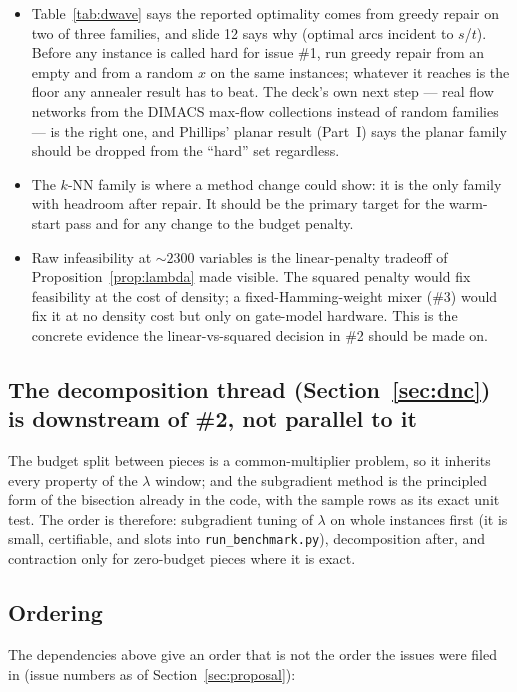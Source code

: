 \documentclass[11pt]{article}
\newcommand{\code}[1]{\texttt{#1}}
\begin{document}
\begin{itemize}[leftmargin=1.5em]
\item Table~\ref{tab:dwave} says the reported optimality comes from greedy repair on two of three families, and slide 12 says why (optimal arcs incident to $s$/$t$). Before any instance is called hard for issue \#1, run greedy repair from an empty and from a random $x$ on the same instances; whatever it reaches is the floor any annealer result has to beat. The deck's own next step --- real flow networks from the DIMACS max-flow collections instead of random families --- is the right one, and Phillips' planar result (Part~I) says the planar family should be dropped from the ``hard'' set regardless.
\item The $k$-NN family is where a method change could show: it is the only family with headroom after repair. It should be the primary target for the warm-start pass and for any change to the budget penalty.
\item Raw infeasibility at $\sim 2300$ variables is the linear-penalty tradeoff of Proposition~\ref{prop:lambda} made visible. The squared penalty would fix feasibility at the cost of density; a fixed-Hamming-weight mixer (\#3) would fix it at no density cost but only on gate-model hardware. This is the concrete evidence the linear-vs-squared decision in \#2 should be made on.
\end{itemize}

\subsection*{The decomposition thread (Section~\ref{sec:dnc}) is downstream of \#2, not parallel to it}

The budget split between pieces is a common-multiplier problem, so it inherits every property of the $\lambda$ window; and the subgradient method is the principled form of the bisection already in the code, with the sample rows as its exact unit test. The order is therefore: subgradient tuning of $\lambda$ on whole instances first (it is small, certifiable, and slots into \code{run\_benchmark.py}), decomposition after, and contraction only for zero-budget pieces where it is exact.

\subsection*{Ordering}

The dependencies above give an order that is not the order the issues were filed in (issue numbers as of Section~\ref{sec:proposal}):
\end{document}
